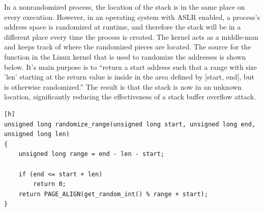 In a nonrandomized process, the location of the stack is in the same place on every execution. However, in an operating system with ASLR enabled, a process’s address space is randomized at runtime, and therefore the stack will be in a different place every time the process is created. The kernel acts as a middle-man and keeps track of where the randomized pieces are located. The source for the function in the Linux kernel that is used to randomize the addresses is shown below. It’s main purpose is to “return a start address such that a range with size 'len' starting at the return value is inside in the area defined by [start, end], but is otherwise randomized.” \cite{randomc} The result is that the stack is now in an unknown location, significantly reducing the effectiveness of a stack buffer overflow attack.

\begin{lstlisting}[caption=Source for the range randomization function][h]
unsigned long randomize_range(unsigned long start, unsigned long end, unsigned long len)
{
	unsigned long range = end - len - start;

	if (end <= start + len)
		return 0;
	return PAGE_ALIGN(get_random_int() % range + start);
}
\end{lstlisting}
